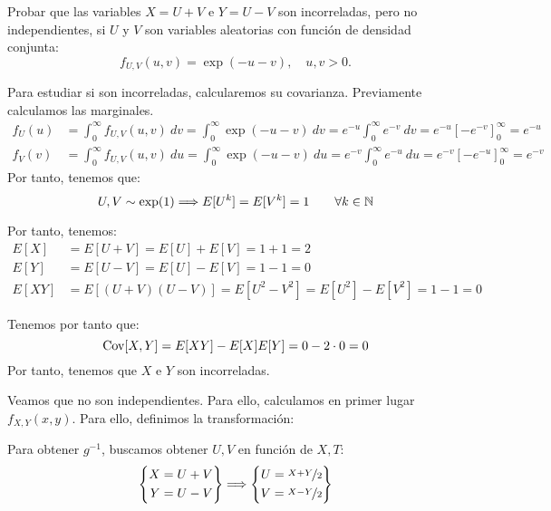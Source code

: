\begin{ejercicio} \label{ej:4.7}
    Probar que las variables $X = U + V$ e $Y = U - V$ son incorreladas, pero no independientes, si $U$ y $V$ son variables aleatorias con función de densidad conjunta:
    \begin{equation*}
        f_{U,V}(u, v) = \exp(-u-v), \quad u, v > 0.
    \end{equation*}

    Para estudiar si son incorreladas, calcularemos su covarianza. Previamente calculamos las marginales.
    \begin{align*}
        f_U(u) &= \int_{0}^{\infty} f_{U,V}(u, v) \ dv = \int_{0}^{\infty} \exp(-u-v) \ dv
        = e^{-u}\int_{0}^{\infty} e^{-v} \ dv
        = e^{-u}\left[-e^{-v}\right]_{0}^{\infty}
        = e^{-u}\\
        f_V(v) &= \int_{0}^{\infty} f_{U,V}(u, v) \ du = \int_{0}^{\infty} \exp(-u-v) \ du
        = e^{-v}\int_{0}^{\infty} e^{-u} \ du
        = e^{-v}\left[-e^{-u}\right]_{0}^{\infty}
        = e^{-v}
    \end{align*}
    Por tanto, tenemos que:
    \begin{equation*}
        U,V\sim \exp(1)
        \Longrightarrow E[U^k]=E[V^k]=1\qquad \forall k\in \mathbb{N}
    \end{equation*}

    Por tanto, tenemos:
    \begin{align*}
        E[X] &= E[U+V] = E[U]+E[V] = 1+1 = 2\\
        E[Y] &= E[U-V] = E[U]-E[V] = 1-1 = 0\\
        E[XY] &= E[(U+V)(U-V)] = E[U^2-V^2] = E[U^2]-E[V^2] = 1-1 = 0
    \end{align*}

    Tenemos por tanto que:
    \begin{equation*}
        \operatorname{Cov}[X,Y] = E[XY] - E[X]E[Y] = 0 - 2\cdot 0 = 0
    \end{equation*}
    Por tanto, tenemos que $X$ e $Y$ son incorreladas.

    Veamos que no son independientes. Para ello, calculamos en primer lugar $f_{X,Y}(x, y)$. Para ello, definimos la transformación:

    Para obtener $g^{-1}$, buscamos obtener $U,V$ en función de $X,T$:
    \begin{equation*}
        \left\{
            \begin{aligned}
                X=U+V\\
                Y=U-V
            \end{aligned}
        \right\}
        \Longrightarrow
        \left\{
            \begin{aligned}
                U=\nicefrac{X+Y}{2}\\
                V=\nicefrac{X-Y}{2}
            \end{aligned}
        \right\}
    \end{equation*}


\end{ejercicio}

